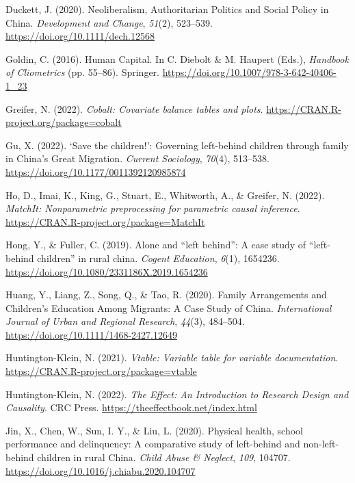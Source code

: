 \documentclass[
  man,floatsintext]{apa7}
\newlength{\cslhangindent}
\newlength{\cslentryspacingunit} %
\newenvironment{CSLReferences}[2] %
 {%
  \setlength{\parindent}{0pt}
  \ifodd #1
  \let\oldpar\par
  \def\par{\hangindent=\cslhangindent\oldpar}
  \fi
  \setlength{\parskip}{#2\cslentryspacingunit}
 }%
 {}
\begin{document}
\begin{CSLReferences}{1}{0}
\leavevmode{}%
Duckett, J. (2020). Neoliberalism, Authoritarian Politics and Social Policy in China. \emph{Development and Change}, \emph{51}(2), 523--539. \url{https://doi.org/10.1111/dech.12568}

\leavevmode{}%
Goldin, C. (2016). Human Capital. In C. Diebolt \& M. Haupert (Eds.), \emph{Handbook of Cliometrics} (pp. 55--86). Springer. \url{https://doi.org/10.1007/978-3-642-40406-1_23}

\leavevmode{}%
Greifer, N. (2022). \emph{Cobalt: Covariate balance tables and plots}. \url{https://CRAN.R-project.org/package=cobalt}

\leavevmode{}%
Gu, X. (2022). {`}Save the children!{'}: Governing left-behind children through family in China{'}s Great Migration. \emph{Current Sociology}, \emph{70}(4), 513--538. \url{https://doi.org/10.1177/0011392120985874}

\leavevmode{}%
Ho, D., Imai, K., King, G., Stuart, E., Whitworth, A., \& Greifer, N. (2022). \emph{MatchIt: Nonparametric preprocessing for parametric causal inference}. \url{https://CRAN.R-project.org/package=MatchIt}

\leavevmode{}%
Hong, Y., \& Fuller, C. (2019). Alone and {``}left behind{''}: A case study of {``}left-behind children{''} in rural china. \emph{Cogent Education}, \emph{6}(1), 1654236. \url{https://doi.org/10.1080/2331186X.2019.1654236}

\leavevmode{}%
Huang, Y., Liang, Z., Song, Q., \& Tao, R. (2020). Family Arrangements and Children's Education Among Migrants: A Case Study of China. \emph{International Journal of Urban and Regional Research}, \emph{44}(3), 484--504. \url{https://doi.org/10.1111/1468-2427.12649}

\leavevmode{}%
Huntington-Klein, N. (2021). \emph{Vtable: Variable table for variable documentation}. \url{https://CRAN.R-project.org/package=vtable}

\leavevmode{}%
Huntington-Klein, N. (2022). \emph{The Effect: An Introduction to Research Design and Causality}. CRC Press. \url{https://theeffectbook.net/index.html}

\leavevmode{}%
Jin, X., Chen, W., Sun, I. Y., \& Liu, L. (2020). Physical health, school performance and delinquency: A comparative study of left-behind and non-left-behind children in rural China. \emph{Child Abuse \& Neglect}, \emph{109}, 104707. \url{https://doi.org/10.1016/j.chiabu.2020.104707}


\end{CSLReferences}
\end{document}
